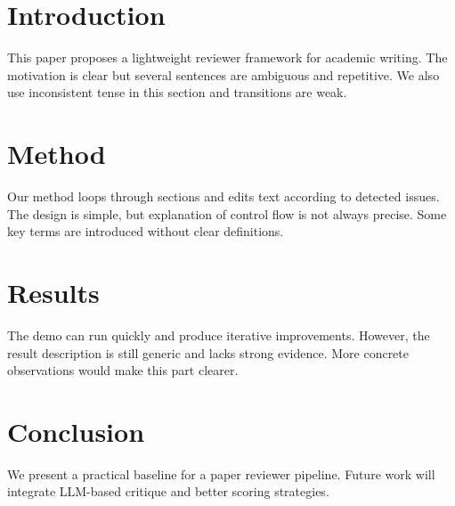 \section{Introduction}
This paper proposes a lightweight reviewer framework for academic writing.
The motivation is clear but several sentences are ambiguous and repetitive.
We also use inconsistent tense in this section and transitions are weak.

\section{Method}
Our method loops through sections and edits text according to detected issues.
The design is simple, but explanation of control flow is not always precise.
Some key terms are introduced without clear definitions.

\section{Results}
The demo can run quickly and produce iterative improvements.
However, the result description is still generic and lacks strong evidence.
More concrete observations would make this part clearer.

\section{Conclusion}
We present a practical baseline for a paper reviewer pipeline.
Future work will integrate LLM-based critique and better scoring strategies.
